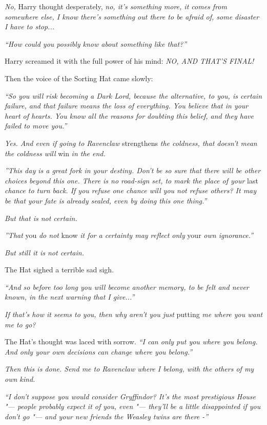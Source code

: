 \emph{No,} Harry thought desperately, \emph{no, it's something more, it
comes from somewhere else, I know there's something out there to be
afraid of, some disaster I have to stop...}

\emph{``How could you possibly know about something like that?''}

Harry screamed it with the full power of his mind: \emph{NO, AND THAT'S
FINAL!}

Then the voice of the Sorting Hat came slowly:

\emph{``So you will risk becoming a Dark Lord, because the alternative,
to you, is certain failure, and that failure means the loss of
everything. You believe that in your heart of hearts. You know all the
reasons for doubting this belief, and they have failed to move you.''}

\emph{Yes. And even if going to Ravenclaw} strengthens \emph{the
coldness, that doesn't mean the coldness will} win \emph{in the end.}

\emph{''This day is a great fork in your destiny. Don't be so sure that
there will be other choices beyond this one. There is no road-sign set,
to mark the place of your} last \emph{chance to turn back. If you refuse
one chance will you not refuse others? It may be that your fate is
already sealed, even by doing this one thing.''}

\emph{But that is not certain.}

\emph{''That} you \emph{do not} know \emph{it for a certainty may reflect
only} your \emph{own ignorance.''}

\emph{But still it is not certain.}

The Hat sighed a terrible sad sigh.

\emph{``And so before too long you will become another memory, to be
felt and never known, in the next warning that I give...''}

\emph{If that's how it seems to you, then why aren't you just} putting
\emph{me where you want me to go?}

The Hat's thought was laced with sorrow. \emph{``I can only put you
where you belong. And only your own decisions can change where you
belong.''}

\emph{Then this is done. Send me to Ravenclaw where I belong, with the
others of my own kind.}

\emph{``I don't suppose you would consider Gryffindor? It's the most
prestigious House "--- people probably expect it of you, even "--- they'll be
a little disappointed if you don't go "--- and your new friends the Weasley
twins are there -''}

